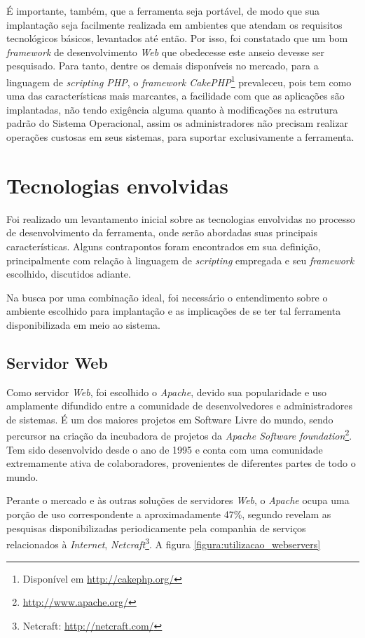 É importante, também, que a ferramenta seja portável, de modo que sua implantação seja facilmente realizada em ambientes que atendam os requisitos tecnológicos básicos, levantados até então. Por isso, foi constatado que um bom \textit{framework} de desenvolvimento \textit{Web} que obedecesse este anseio devesse ser pesquisado. Para tanto, dentre os demais disponíveis no mercado, para a linguagem de \textit{scripting PHP}, o \textit{framework CakePHP}\footnote{Disponível em \url{http://cakephp.org/}} prevaleceu, pois tem como uma das características mais marcantes, a facilidade com que as aplicações são implantadas, não tendo exigência alguma quanto à modificações na estrutura padrão do Sistema Operacional, assim os administradores não precisam realizar operações custosas em seus sistemas, para suportar exclusivamente a ferramenta.


\section{Tecnologias envolvidas}

Foi realizado um levantamento inicial sobre as tecnologias envolvidas no processo de desenvolvimento da ferramenta, onde serão abordadas suas principais características. Alguns contrapontos foram encontrados em sua definição, principalmente com relação à linguagem de \textit{scripting} empregada e seu \textit{framework} escolhido, discutidos adiante.

Na busca por uma combinação ideal, foi necessário o entendimento sobre o ambiente escolhido para implantação e as implicações de se ter tal ferramenta disponibilizada em meio ao sistema.

\subsection{Servidor Web}

Como servidor \textit{Web}, foi escolhido o \textit{Apache}, devido sua popularidade e uso amplamente difundido entre a comunidade de desenvolvedores e administradores de sistemas. É um dos maiores projetos em Software Livre do mundo, sendo percursor na criação da incubadora de projetos da \textit{Apache Software foundation}\footnote{\url{http://www.apache.org/}}. Tem sido desenvolvido desde o ano de 1995 e conta com uma comunidade extremamente ativa de colaboradores, provenientes de diferentes partes de todo o mundo.

Perante o mercado e às outras soluções de servidores \textit{Web}, o \textit{Apache} ocupa uma porção de uso correspondente a aproximadamente 47\%, segundo revelam as pesquisas \cite{Netcraft} disponibilizadas periodicamente pela companhia de serviços relacionados à \textit{Internet}, \textit{Netcraft}\footnote{Netcraft: \url{http://netcraft.com/}}. A figura \ref{figura:utilizacao_webservers}

